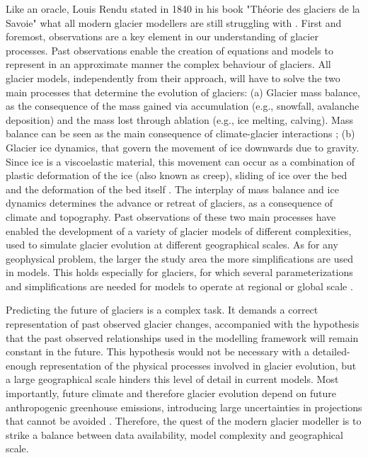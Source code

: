 Like an oracle, Louis Rendu stated in 1840 in his book "Théorie des glaciers de la Savoie" what all modern glacier modellers are still struggling with \citep{rendu_theorie_1840}. First and foremost, observations are a key element in our understanding of glacier processes. Past observations enable the creation of equations and models to represent in an approximate manner the complex behaviour of glaciers. All glacier models, independently from their approach, will have to solve the two main processes that determine the evolution of glaciers: (a) Glacier mass balance, as the consequence of the mass gained via accumulation (e.g., snowfall, avalanche deposition) and the mass lost through ablation (e.g., ice melting, calving). Mass balance can be seen as the main consequence of climate-glacier interactions \citep{benn_glaciers_2014}; (b) Glacier ice dynamics, that govern the movement of ice downwards due to gravity. Since ice is a viscoelastic material, this movement can occur as a combination of plastic deformation of the ice (also known as creep), sliding of ice over the bed and the deformation of the bed itself \citep{cuffey_physics_2010}. The interplay of mass balance and ice dynamics determines the advance or retreat of glaciers, as a consequence of climate and topography. Past observations of these two main processes have enabled the development of a variety of glacier models of different complexities, used to simulate glacier evolution at different geographical scales. As for any geophysical problem, the larger the study area the more simplifications are used in models. This holds especially for glaciers, for which several parameterizations and simplifications are needed for models to operate at regional or global scale \citep[e.g.,][]{marzeion_past_2012, huss_new_2015, maussion_open_2019}. 

Predicting the future of glaciers is a complex task. It demands a correct representation of past observed glacier changes, accompanied with the hypothesis that the past observed relationships used in the modelling framework will remain constant in the future. This hypothesis would not be necessary with a detailed-enough representation of the physical processes involved in glacier evolution, but a large geographical scale hinders this level of detail in current models. Most importantly, future climate and therefore glacier evolution depend on future anthropogenic greenhouse emissions, introducing large uncertainties in projections that cannot be avoided \citep{marzeion_partitioning_2020}. Therefore, the quest of the modern glacier modeller is to strike a balance between data availability, model complexity and geographical scale.

